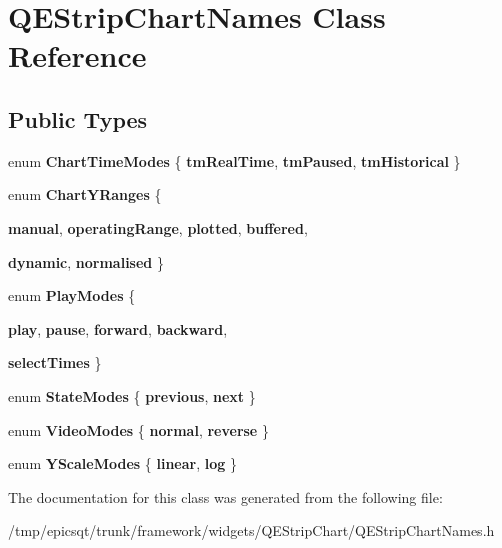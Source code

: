 \hypertarget{classQEStripChartNames}{
\section{QEStripChartNames Class Reference}
\label{classQEStripChartNames}
}
\subsection*{Public Types}
\begin{DoxyCompactItemize}
\item 
enum {\bfseries ChartTimeModes} \{ {\bfseries tmRealTime}, 
{\bfseries tmPaused}, 
{\bfseries tmHistorical}
 \}
\item 
enum {\bfseries ChartYRanges} \{ \par
{\bfseries manual}, 
{\bfseries operatingRange}, 
{\bfseries plotted}, 
{\bfseries buffered}, 
\par
{\bfseries dynamic}, 
{\bfseries normalised}
 \}
\item 
enum {\bfseries PlayModes} \{ \par
{\bfseries play}, 
{\bfseries pause}, 
{\bfseries forward}, 
{\bfseries backward}, 
\par
{\bfseries selectTimes}
 \}
\item 
enum {\bfseries StateModes} \{ {\bfseries previous}, 
{\bfseries next}
 \}
\item 
enum {\bfseries VideoModes} \{ {\bfseries normal}, 
{\bfseries reverse}
 \}
\item 
enum {\bfseries YScaleModes} \{ {\bfseries linear}, 
{\bfseries log}
 \}
\end{DoxyCompactItemize}


The documentation for this class was generated from the following file:\begin{DoxyCompactItemize}
\item 
/tmp/epicsqt/trunk/framework/widgets/QEStripChart/QEStripChartNames.h\end{DoxyCompactItemize}
